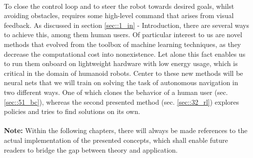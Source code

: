 \\
To close the control loop and to steer the robot towards desired goals, whilst avoiding obstacles, requires some high-level command that arises from visual feedback. As discussed in section \ref{sec::1_in} - Introduction, there are several ways to achieve this, among them human users. Of particular interest to us are novel methods that evolved from the toolbox of machine learning techniques, as they decrease the computational cost into nonexistence. Let alone this fact enables us to run them onboard on lightweight hardware with low energy usage, which is critical in the domain of humanoid robots. Center to these new methods will be neural nets that we will train on solving the task of autonomous navigation in two different ways. One of which clones the behavior of a human user (sec. \ref{sec::51_bc}), whereas the second presented method (sec. \ref{sec::32_rl}) explores policies and tries to find solutions on its own.
\\\\
\textbf{Note:} Within the following chapters, there will always be made references to the actual implementation of the presented concepts, which shall enable future readers to bridge the gap between theory and application.